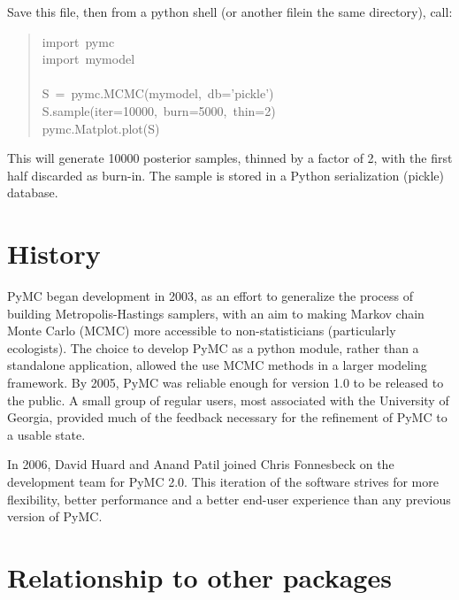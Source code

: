 Save this file, then from a python shell (or another filein the same directory), call:
\begin{quote}{\ttfamily \raggedright \noindent
import~pymc~\\
import~mymodel~\\
~\\
S~=~pymc.MCMC(mymodel,~db='pickle')~\\
S.sample(iter=10000,~burn=5000,~thin=2)~\\
pymc.Matplot.plot(S)
}\end{quote}

This will generate 10000 posterior samples, thinned by a factor of 2, with the first half discarded as burn-in. The sample is stored in a Python serialization (pickle) database.



\hypertarget{history}{}
\section{History}
\label{history}

PyMC began development in 2003, as an effort to generalize the process of building Metropolis-Hastings samplers, with an aim to making Markov chain Monte Carlo (MCMC) more accessible to non-statisticians (particularly ecologists). The choice to develop PyMC as a python module, rather than a standalone application, allowed the use MCMC methods in a larger modeling framework. By 2005, PyMC was reliable enough for version 1.0 to be released to the public. A small group of regular users, most associated with the University of Georgia, provided much of the feedback necessary for the refinement of PyMC to a usable state.

In 2006, David Huard and Anand Patil joined Chris Fonnesbeck on the development team for PyMC 2.0. This iteration of the software strives for more flexibility, better performance and a better end-user experience than any previous version of PyMC.



\hypertarget{relationship-to-other-packages}{}
\section{Relationship to other packages}
\label{relationship-to-other-packages}

